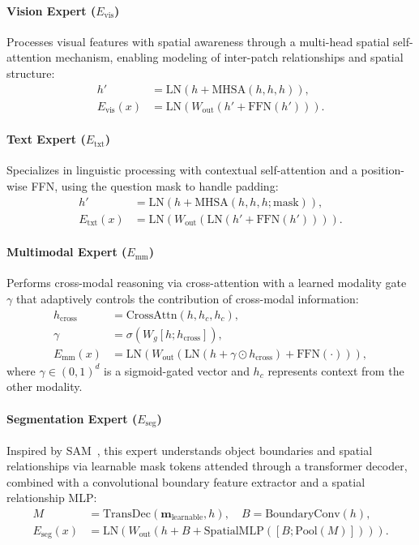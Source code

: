\paragraph{Vision Expert ($E_{\text{vis}}$)}
Processes visual features with spatial awareness through a multi-head spatial self-attention mechanism, enabling modeling of inter-patch relationships and spatial structure:
\begin{align}
    h' &= \text{LN}\!\left(h + \text{MHSA}(h, h, h)\right), \\
    E_{\text{vis}}(x) &= \text{LN}\!\left(W_{\text{out}}\!\left(h' + \text{FFN}(h')\right)\right).
\end{align}

\paragraph{Text Expert ($E_{\text{txt}}$)}
Specializes in linguistic processing with contextual self-attention and a position-wise FFN, using the question mask to handle padding:
\begin{align}
    h' &= \text{LN}\!\left(h + \text{MHSA}(h, h, h; \text{mask})\right), \\
    E_{\text{txt}}(x) &= \text{LN}\!\left(W_{\text{out}}\!\left(\text{LN}(h' + \text{FFN}(h'))\right)\right).
\end{align}

\paragraph{Multimodal Expert ($E_{\text{mm}}$)}
Performs cross-modal reasoning via cross-attention with a learned modality gate $\gamma$ that adaptively controls the contribution of cross-modal information:
\begin{align}
    h_{\text{cross}} &= \text{CrossAttn}(h, h_c, h_c), \\
    \gamma &= \sigma\!\left(W_g [h; h_{\text{cross}}]\right), \label{eq:modality_gate} \\
    E_{\text{mm}}(x) &= \text{LN}\!\left(W_{\text{out}}\!\left(\text{LN}(h + \gamma \odot h_{\text{cross}}) + \text{FFN}(\cdot)\right)\right),
\end{align}
where $\gamma \in (0,1)^d$ is a sigmoid-gated vector and $h_c$ represents context from the other modality.

\paragraph{Segmentation Expert ($E_{\text{seg}}$)}
Inspired by SAM~\cite{kirillov2023segment}, this expert understands object boundaries and spatial relationships via learnable mask tokens attended through a transformer decoder, combined with a convolutional boundary feature extractor and a spatial relationship MLP:
\begin{align}
    M &= \text{TransDec}(\mathbf{m}_{\text{learnable}}, h), \quad B = \text{BoundaryConv}(h), \\
    E_{\text{seg}}(x) &= \text{LN}\!\left(W_{\text{out}}\!\left(h + B + \text{SpatialMLP}([B; \text{Pool}(M)])\right)\right).
\end{align}

